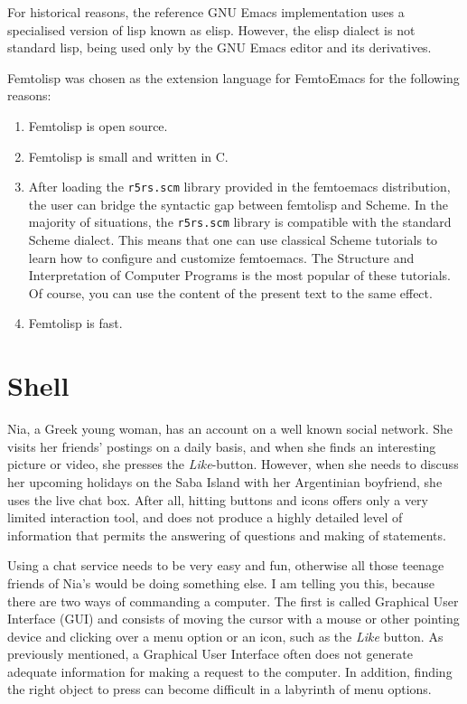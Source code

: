 \documentclass[a4paper,12pt]{book}
\begin{document}
  For historical reasons, the reference GNU
  Emacs implementation uses a specialised version of
  lisp known as elisp.  However, the elisp
  dialect is not standard lisp, being used
  only by the GNU Emacs editor and its
  derivatives.

  Femtolisp was chosen
  as the extension language
  for FemtoEmacs for the following reasons:
\begin{enumerate}
\item Femtolisp is open source.
\item Femtolisp is small and written in C.
\item After loading the \verb|r5rs.scm| library
  provided in the femtoemacs distribution,
  the user can bridge the syntactic gap
  between femtolisp and Scheme.
  In the majority of situations, the \verb|r5rs.scm|
  library is compatible
  with the standard Scheme dialect. This means that
  one can use classical Scheme tutorials to learn
  how to configure and customize femtoemacs.
  The Structure and Interpretation of Computer Programs
  is the most popular of these tutorials.
  Of course, you can use the content of the
  present text to the same effect.
\item Femtolisp is fast.
\end{enumerate}    

\mainmatter


\chapter{Shell}

Nia, a Greek young woman, has an
account on a well known social network.
She visits her friends' postings on a daily basis,
and when she finds an interesting picture or video,
she presses the {\em Like}-button. However, when
she needs to discuss her upcoming holidays on the Saba Island
with her Argentinian boyfriend, she uses the
live chat box. After all, hitting buttons and
icons offers only a very limited interaction tool,
and does not produce a highly detailed
level of information that permits the answering
of questions and making of statements.


Using a chat service needs to
be very easy and fun, otherwise all those teenage
friends of Nia's would be doing something else.
I am telling you this, because there are
two ways of commanding a computer.
The first is called Graphical User Interface (GUI)
and consists of moving the cursor with a
mouse or other pointing device and clicking
over a menu option or an icon,
such as the {\em Like} button.
As previously mentioned, a Graphical User Interface
often does not generate adequate information
for making a request to the computer. In addition,
finding the right object  to press
can become difficult in a labyrinth of
menu options.
\end{document}

